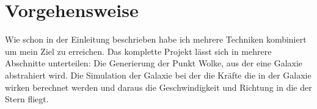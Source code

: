\section{Vorgehensweise}
Wie schon in der Einleitung beschrieben habe ich mehrere Techniken kombiniert
um mein Ziel zu erreichen. Das komplette Projekt lässt sich in mehrere
Abschnitte unterteilen: Die Generierung der Punkt Wolke, aus der eine Galaxie
abstrahiert wird.  Die Simulation der Galaxie bei der die Kräfte die in der
Galaxie wirken berechnet werden und daraus die Geschwindigkeit und Richtung in
die der Stern fliegt.
